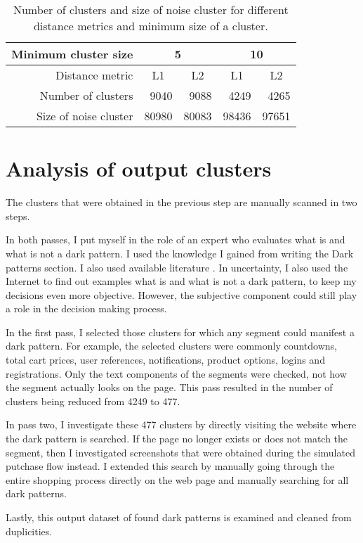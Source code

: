         \begin{table}[h!]
            \centering
            \begin{tabular}{r|cr|cr|}
            Minimum cluster size  & \multicolumn{2}{c|}{5}                               & \multicolumn{2}{c|}{10}                              \\ \hline
            Distance metric       & \multicolumn{1}{c|}{L1}    & \multicolumn{1}{c|}{L2} & \multicolumn{1}{c|}{L1}    & \multicolumn{1}{c|}{L2} \\ \hline
            Number of clusters    & \multicolumn{1}{r|}{9040}  & 9088                    & \multicolumn{1}{r|}{4249}  & 4265                    \\ \hline
            Size of noise cluster & \multicolumn{1}{r|}{80980} & 80083                   & \multicolumn{1}{r|}{98436} & 97651                   \\ \cline{1-5} 
            \end{tabular}
            \caption{Number of clusters and size of noise cluster for different distance metrics and minimum size of a cluster.}
            \label{table:hyperparameters-hdbscan}
        \end{table}

    \section{Analysis of output clusters}
    \label{section:analysis-of-output-clusters}
        The clusters that were obtained in the previous step are manually scanned in two steps.

        In both passes, I put myself in the role of an expert who evaluates what is and what is not a dark pattern. I used the knowledge I gained from writing the Dark patterns section. I also used available literature \cite{dark-patterns-brignull-types}\cite{dark-patterns-colin}\cite{kysar-douglas}\cite{taxonomies-tales}\cite{taxonomies-conti}. In uncertainty, I also used the Internet to find out examples what is and what is not a dark pattern, to keep my decisions even more objective. However, the subjective component could still play a role in the decision making process.

        In the first pass, I selected those clusters for which any segment could manifest a dark pattern. For example, the selected clusters were commonly countdowns, total cart prices, user references, notifications, product options, logins and registrations. Only the text components of the segments were checked, not how the segment actually looks on the page. This pass resulted in the number of clusters being reduced from 4249 to 477.
        
        In pass two, I investigate these 477 clusters by directly visiting the website where the dark pattern is searched. If the page no longer exists or does not match the segment, then I investigated screenshots that were obtained during the simulated putchase flow instead. I extended this search by manually going through the entire shopping process directly on the web page and manually searching for all dark patterns.
        
        Lastly, this output dataset of found dark patterns is examined and cleaned from duplicities.